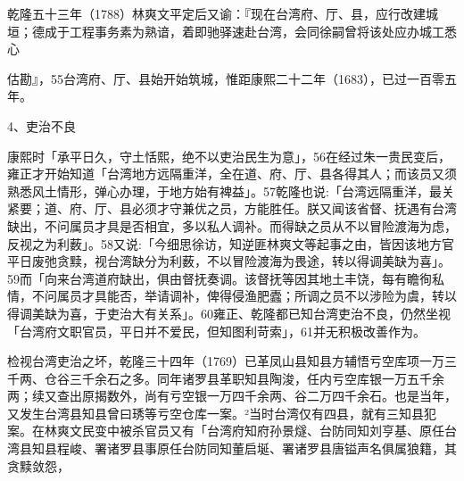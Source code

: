 乾隆五十三年（1788）林爽文平定后又谕：『现在台湾府、厅、县，应行改建城垣；德成于工程事务素为熟谙，着即驰驿速赴台湾，会同徐嗣曾将该处应办城工悉心

\vfill
\begin{BookNotes}
\end{BookNotes}

\noindent 估勘』，55台湾府、厅、县始开始筑城，惟距康熙二十二年（1683），已过一百零五年。

4、吏治不良

康熙时「承平日久，守土恬熙，绝不以吏治民生为意」，56在经过朱一贵民变后，雍正才开始知道「台湾地方远隔重洋，全在道、府、厅、县各得其人；而该员又须熟悉风土情形，弹心办理，于地方始有裨益」。57乾隆也说:「台湾远隔重洋，最关紧要；道、府、厅、县必须才守兼优之员，方能胜任。朕又闻该省督、抚遇有台湾缺出，不问属员才具是否相宜，多以私人调补。而得缺之员从不以冒险渡海为虑，反视之为利薮」。58又说:「今细思徐访，知逆匪林爽文等起事之由，皆因该地方官平日废弛贪黩，视台湾缺分为利薮，不以冒险渡海为畏途，转以得调美缺为喜」。59而「向来台湾道府缺出，俱由督抚奏调。该督抚等因其地土丰饶，每有瞻徇私情，不问属员才具能否，举请调补，俾得侵渔肥蠹；所调之员不以涉险为虞，转以得调美缺为喜，于吏治大有关系」。60雍正、乾隆都已知台湾吏治不良，仍然坐视「台湾府文职官员，平日并不爱民，但知图利苛索」，61并无积极改善作为。

检视台湾吏治之坏，乾隆三十四年（1769）已革凤山县知县方辅悟亏空库项一万三千两、仓谷三千余石之多。同年诸罗县革职知县陶浚，任内亏空库银一万五千余两；续又查出原揭数外，尚有亏空银一万四千余两、谷二万四千余石。也是当年，又发生台湾县知县曾曰琇等亏空仓库一案。²当时台湾仅有四县，就有三知县犯案。在林爽文民变中被杀官员又有「台湾府知府孙景燧、台防同知刘亨基、原任台湾县知县程峻、署诸罗县事原任台防同知董启埏、署诸罗县唐镒声名俱属狼籍，其贪黩敛怨，

\vfill
\begin{BookNotes}
\end{BookNotes}

